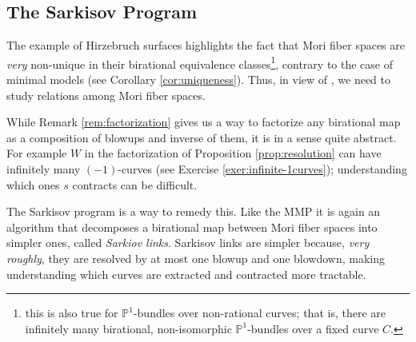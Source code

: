 \documentclass[a4paper,11pt]{amsart}
\newcommand{\PP}{\mathbb{P}}
\begin{document}
	
\subsection{The Sarkisov Program}

The example of Hirzebruch surfaces highlights the fact that Mori fiber spaces are \emph{very} non-unique in their birational equivalence classes\footnote{this is also true for $\PP^1$-bundles over non-rational curves; that is, there are infinitely many birational, non-isomorphic $\PP^1$-bundles over a fixed curve $C$.}, contrary to the case of minimal models (see Corollary \ref{cor:uniqueness}).
Thus, in view of \hyperref[it:MMP3]{{\small {}}}, we need to study relations among Mori fiber spaces.

While Remark \ref{rem:factorization} gives us a way to factorize any birational map as a composition of blowups and inverse of them, it is in a sense quite abstract.
For example $W$ in the factorization of Proposition \ref{prop:resolution} can have infinitely many $(-1)$-curves (see Exercise \ref{exer:infinite-1curves});
understanding which ones $s$ contracts can be difficult.

The Sarkisov program is a way to remedy this.
Like the MMP it is again an algorithm that decomposes a birational map between Mori fiber spaces into simpler ones, called \emph{Sarkiov links}.
Sarkisov links are simpler because, \emph{very roughly}, they are resolved by at most one blowup and one blowdown, making understanding which curves are extracted and contracted more tractable.
\end{document}
